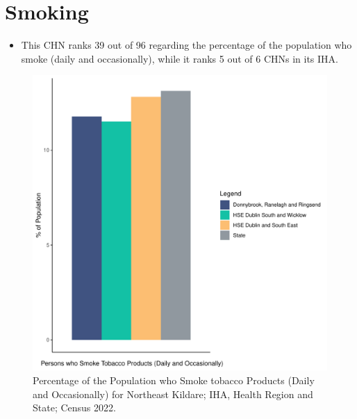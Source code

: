\documentclass{article}
\begin{document}
\pagebreak

\section{Smoking}\label{sect:Smoking}
\begin{itemize}
\item This CHN ranks  39 out of 96 regarding the percentage of the population who smoke (daily and occasionally), while it ranks   5 out of 6 CHNs in its IHA.
\end{itemize}
\begin{figure}[H]
	\centering
	\includegraphics[width = 120mm]{../figures/SmokingED.pdf}
	\caption{Percentage of the Population who Smoke tobacco Products (Daily and Occasionally) for Northeast Kildare; IHA, Health Region and State; Census 2022.}
	\label{fig:2ae19629-1a6a-13a3-e055-000000000001}
	\end{figure}
	
\end{document}
